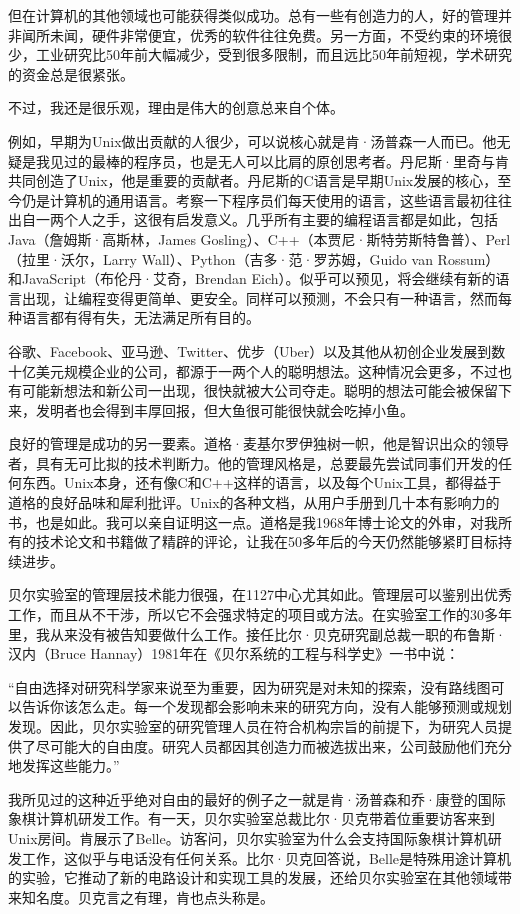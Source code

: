 \documentclass[a4paper,12pt,UTF8,twoside]{ctexbook}
\begin{document}
但在计算机的其他领域也可能获得类似成功。总有一些有创造力的人，好的管理并非闻所未闻，硬件非常便宜，优秀的软件往往免费。另一方面，不受约束的环境很少，工业研究比50年前大幅减少，受到很多限制，而且远比50年前短视，学术研究的资金总是很紧张。

不过，我还是很乐观，理由是伟大的创意总来自个体。

例如，早期为Unix做出贡献的人很少，可以说核心就是肯·汤普森一人而已。他无疑是我见过的最棒的程序员，也是无人可以比肩的原创思考者。丹尼斯·里奇与肯共同创造了Unix，他是重要的贡献者。丹尼斯的C语言是早期Unix发展的核心，至今仍是计算机的通用语言。考察一下程序员们每天使用的语言，这些语言最初往往出自一两个人之手，这很有启发意义。几乎所有主要的编程语言都是如此，包括Java（詹姆斯·高斯林，James Gosling）、C++（本贾尼·斯特劳斯特鲁普）、Perl（拉里·沃尔，Larry Wall）、Python（吉多·范·罗苏姆，Guido van Rossum）和JavaScript（布伦丹·艾奇，Brendan Eich）。似乎可以预见，将会继续有新的语言出现，让编程变得更简单、更安全。同样可以预测，不会只有一种语言，然而每种语言都有得有失，无法满足所有目的。

谷歌、Facebook、亚马逊、Twitter、优步（Uber）以及其他从初创企业发展到数十亿美元规模企业的公司，都源于一两个人的聪明想法。这种情况会更多，不过也有可能新想法和新公司一出现，很快就被大公司夺走。聪明的想法可能会被保留下来，发明者也会得到丰厚回报，但大鱼很可能很快就会吃掉小鱼。

良好的管理是成功的另一要素。道格·麦基尔罗伊独树一帜，他是智识出众的领导者，具有无可比拟的技术判断力。他的管理风格是，总要最先尝试同事们开发的任何东西。Unix本身，还有像C和C++这样的语言，以及每个Unix工具，都得益于道格的良好品味和犀利批评。Unix的各种文档，从用户手册到几十本有影响力的书，也是如此。我可以亲自证明这一点。道格是我1968年博士论文的外审，对我所有的技术论文和书籍做了精辟的评论，让我在50多年后的今天仍然能够紧盯目标持续进步。

贝尔实验室的管理层技术能力很强，在1127中心尤其如此。管理层可以鉴别出优秀工作，而且从不干涉，所以它不会强求特定的项目或方法。在实验室工作的30多年里，我从来没有被告知要做什么工作。接任比尔·贝克研究副总裁一职的布鲁斯·汉内（Bruce Hannay）1981年在《贝尔系统的工程与科学史》一书中说：

“自由选择对研究科学家来说至为重要，因为研究是对未知的探索，没有路线图可以告诉你该怎么走。每一个发现都会影响未来的研究方向，没有人能够预测或规划发现。因此，贝尔实验室的研究管理人员在符合机构宗旨的前提下，为研究人员提供了尽可能大的自由度。研究人员都因其创造力而被选拔出来，公司鼓励他们充分地发挥这些能力。”



我所见过的这种近乎绝对自由的最好的例子之一就是肯·汤普森和乔·康登的国际象棋计算机研发工作。有一天，贝尔实验室总裁比尔·贝克带着位重要访客来到Unix房间。肯展示了Belle。访客问，贝尔实验室为什么会支持国际象棋计算机研发工作，这似乎与电话没有任何关系。比尔·贝克回答说，Belle是特殊用途计算机的实验，它推动了新的电路设计和实现工具的发展，还给贝尔实验室在其他领域带来知名度。贝克言之有理，肯也点头称是。
\end{document}

